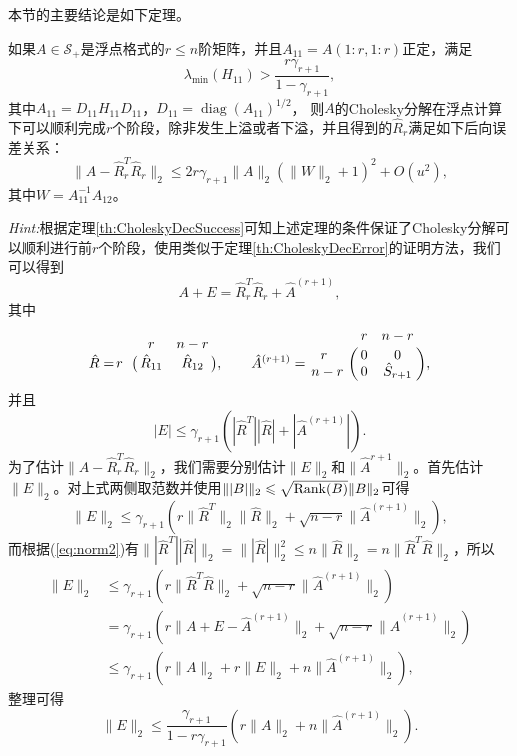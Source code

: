 \documentclass[a4paper,10pt]{ctexart}
\begin{document}
本节的主要结论是如下定理。
\begin{theorem}
    如果$ A\in \mathcal{S}_+ $是浮点格式的$ r\leqslant n $阶矩阵，并且$ A_{11} = A(1:r,1:r) $正定，满足
    \begin{equation}
        \lambda_{\min}(H_{11}) >\frac{r\gamma_{r+1}}{1-\gamma_{r+1}},
    \end{equation}
    其中$ A_{11} = D_{11}H_{11} D_{11} $，$ D_{11} = \operatorname{diag}(A_{11})^{1 / 2} $，
    则$ A $的Cholesky分解在浮点计算下可以顺利完成$ r $个阶段，除非发生上溢或者下溢，并且得到的$ \hat{R}_r $满足如下后向误差关系：
    \begin{equation}
        \| A -  \hat{R}_r^T \hat{R}_r \|_2 \leqslant 2r \gamma_{r+1} \| A \|_2 (\| W \|_2+1)^2 +O(u^2),
    \end{equation}
    其中$ W = A_{11}^{-1}A_{12} $。
\end{theorem}
\noindent \emph{Hint:}根据定理\ref{th:CholeskyDecSuccess}可知上述定理的条件保证了Cholesky分解可以顺利进行前$ r $个阶段，使用类似于定理\ref{th:CholeskyDecError}的证明方法，我们可以得到
\begin{equation}
    A+E = \hat{R}_r^T \hat{R}_r + \hat{A}^{(r+1)},
\end{equation}
其中
\[
    \hat{R} = 
    \bordermatrix{
         & r & n-r \cr
        r & \hat{R}_{11}  & \hat{R}_{12}
    },\qquad
    \hat{A}^{(r+1)} = 
    \bordermatrix{
            & r & n-r \cr
            \ \ r & 0  & 0 \cr
            n-r & 0  & \hat{S}_{r+1}
        },   
\]
并且
\[
    |E| \leqslant \gamma_{r+1} (|\hat{R}^T| |\hat{R}|+|\hat{A}^{(r+1)}|).
\]
为了估计$ \| A -  \hat{R}_r^T \hat{R}_r \|_2 $，我们需要分别估计$ \| E \|_2 $和$ \| \hat{A}^{r+1} \|_2 $。首先估计$ \| E \|_2 $。对上式两侧取范数并使用$ \| |B| \|_2\leqslant \sqrt{{\rm Rank}(B)} \| B \|_2 $可得
\[
    \| E \|_2 \leqslant \gamma_{r+1} (r\| \hat{R}^T \|_2 \| \hat{R} \|_2 + \sqrt{n-r} \| \hat{A}^{(r+1)} \|_2),
\]
而根据(\ref{eq:norm2})有$ \| |\hat{R}^T| |\hat{R}| \|_2 = \| |\hat{R}| \|_2^2 \leqslant n \| \hat{R} \|_2=n\| \hat{R}^T\hat{R} \|_2  $，所以
\[
    \begin{aligned}
        \| E \|_2 &\leqslant \gamma_{r+1} (r\| \hat{R}^T \hat{R} \|_2 + \sqrt{n-r} \| \hat{A}^{(r+1)} \|_2)\\
        &= \gamma_{r+1} (r\| A+E-\hat{A}^{(r+1)} \|_2 + \sqrt{n-r} \| \hat{A}^{(r+1)} \|_2)\\
        &\leqslant \gamma_{r+1} (r\| A \|_2 + r \| E \|_2 + n \| \hat{A}^{(r+1)} \|_2),
    \end{aligned}
\]
整理可得
\begin{equation}\label{eq:PerturbMat}
    \| E \|_2 \leqslant \frac{\gamma_{r+1}}{1-r \gamma_{r+1}}(r \| A \|_2 + n \| \hat{A}^{(r+1)} \|_2).
\end{equation}
\end{document}
